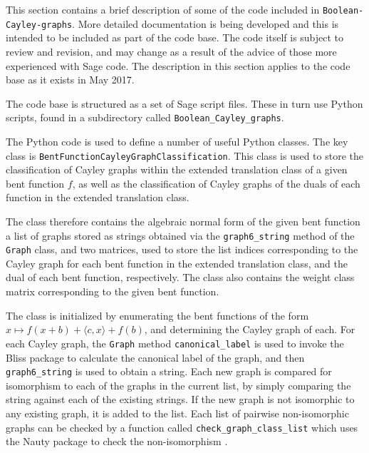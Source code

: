 \documentclass[12pt,a4paper]{article}
\begin{document}
This section contains a brief description of some of the code included in
\texttt{Boolean-Cayley-graphs}.
More detailed documentation is being developed and this is intended to be included as part of the code base.
The code itself is subject to review and revision, and may change as a result of the advice of
those more experienced with Sage code.
The description in this section applies to the code base as it exists in May 2017.

The code base is structured as a set of Sage script files. %
These in turn use Python scripts, found in a  subdirectory called \texttt{Boolean\_Cayley\_graphs}.

The Python code is used to define a number of useful Python classes.
The key class is \texttt{BentFunctionCayleyGraphClassification}.
This class is used to store the classification of Cayley graphs within the extended translation
class of a given bent function $f$, as well as the classification of Cayley graphs of the duals of
each function in the extended translation class.

The class therefore contains the algebraic normal form of the given bent function
a list of graphs
stored as strings obtained via the \texttt{graph6\_string} \cite{McKP13nauty}
method of the \texttt{Graph} class, and two matrices,
used to store the list indices corresponding to
the Cayley graph for each bent function in the extended translation class, and the dual of each bent
function, respectively.
The class also contains the weight class matrix
corresponding to the given bent function.

The class is initialized by enumerating the bent functions of the form
$x \mapsto f(x+b) + \langle c, x \rangle + f(b)$,
and determining the Cayley graph of each.
For each Cayley graph, the \texttt{Graph} method \texttt{canonical\_label} is used
to invoke the Bliss package \cite{JunK07Bliss,JunK11conflict} to calculate the canonical label
of the graph, and then \texttt{graph6\_string} is used to obtain a string.
Each new graph is compared for isomorphism to each of the graphs in the current list,
by simply comparing the string against each of the existing strings.
If the new graph is not isomorphic to any existing graph, it is added to the list.
Each list of pairwise non-isomorphic graphs can be checked by a function called \texttt{check\_graph\_class\_list}
which uses the Nauty package to check the non-isomorphism \cite{McKP13nauty,McKP14practical}.
\end{document}
